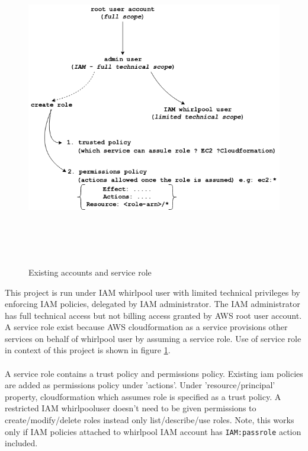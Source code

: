 \\
\\
\begin{figure}[h!]
  \centering
  \includegraphics[width=14cm,height=14cm,keepaspectratio]{../media/crawler/iam_and_roles.png}
  \caption{Existing accounts and service role}
  \label{fig:iamroles}
\end{figure}

\noindent
This project is run under IAM whirlpool user with limited technical privileges by enforcing IAM policies, 
delegated by IAM administrator. The IAM administrator has full technical access but not billing access 
granted by AWS root user account. A service role exist because AWS cloudformation as a service provisions 
other services on behalf of whirlpool user by assuming a service role. Use of service role in context of 
this project is shown in figure \ref{fig:iamroles}.
\\
\\
\noindent
A service role contains a trust policy and permissions policy. Existing iam policies are added as 
permissions policy under 'actions'. Under 'resource/principal' property, cloudformation which assumes role is specified as a trust policy. A restricted IAM whirlpooluser doesn't need to be given permissions to create/modify/delete roles instead only list/describe/use roles. Note, this works only if IAM policies attached to
whirlpool IAM account has \texttt{IAM:passrole} action included.

